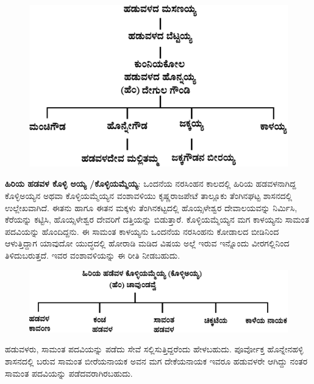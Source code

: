 \begin{figure}[H]
\includegraphics[scale=.15]{images/chap3/chap3fig32.jpeg}
\end{figure}

\textbf{ಹಿರಿಯ ಹಡವಳ ಕೊಳ್ಳಿ ಅಯ್ಯ /ಕೊಳ್ಳಿಯಮ್ಮೆಯ್ಯ}: ಒಂದನೆಯ ನರಸಿಂಹನ ಕಾಲದಲ್ಲಿ ಹಿರಿಯ ಹಡವಳನಾಗಿದ್ದ ಕೊಳ್ಳಿಅಯ್ಯನ ಅಥವಾ ಕೊಳ್ಳಿಯಮ್ಮೆಯ್ಯನ ವಂಶಾವಳಿಯು ಕೃಷ್ಣರಾಜಪೇಟೆ ತಾಲ್ಲೂಕು ತೆಂಗಿನಘಟ್ಟ ಶಾಸನದಲ್ಲಿ ಉಲ್ಲೇಖ\-ವಾಗಿದೆ. ಈತನು ಹಾಗೂ ಈತನ ಮಕ್ಕಳು ತೆಂಗಿನಕಟ್ಟದಲ್ಲಿ ಹೊಯ್ಸಳೇಶ್ವರ ದೇವಾಲಯವನ್ನು ನಿರ್ಮಿಸಿ, ಕೆರೆಯನ್ನು ಕಟ್ಟಿಸಿ, ಹೊಯ್ಸಳೇಶ್ವರ ದೇವರಿಗೆ ದತ್ತಿಯನ್ನು ಬಿಡುತ್ತಾರೆ. ಕೊಳ್ಳಿಯಮ್ಮೆಯ್ಯನ ಮಗ ಕಾಳಯ್ಯನು ಸಾಮಂತ ಪದವಿಯನ್ನು ಹೊಂದಿದ್ದನು. ಈ ಸಾಮಂತ ಕಾಳಯ್ಯನು ಒಂದನೆಯ ನರಸಿಂಹನು ಕೋಡಾಲದ ಬೀಡಿನಿಂದ ಆಳುತ್ತಿದ್ದಾಗ ಯಾವುದೋ ಯುದ್ಧದಲ್ಲಿ ಹೋರಾಡಿ ಮಡಿದ ವಿಷಯ ಅಲ್ಲೆ ಇರುವ ಇನ್ನೊಂದು ವೀರಗಲ್ಲಿನಿಂದ ತಿಳಿದುಬರುತ್ತದೆ. ಇವರ ವಂಶಾವಳಿಯನ್ನು ಈ ರೀತಿ ನೀಡಬಹುದು.

\begin{figure}[H]
\includegraphics[scale=1.25]{images/chap3/chap3fig33.jpeg}
\end{figure}

ಹಡುವಳರು, ಸಾಮಂತ ಪದವಿಯನ್ನು ಪಡೆದು ಸೇವೆ ಸಲ್ಲಿಸುತ್ತಿದ್ದರೆಂದು ಹೇಳಬಹುದು. ಪೂರ್ವೋಕ್ತ ಹೊನ್ನೇನಹಳ್ಳಿ ಶಾಸನದಲ್ಲಿ ಬರುವ ಸಾಮಂತ ಬೀರೆಯನಾಯಕ ಅವನ ಮಗ ದೇಕೆಯನಾಯಕ ಇವರೂ ಹಡುವಳರೇ ಆಗಿದ್ದು ನಂತರ ಸಾಮಂತ ಪದವಿಯನ್ನು ಪಡೆದವರಾಗಿರಬಹುದು.

